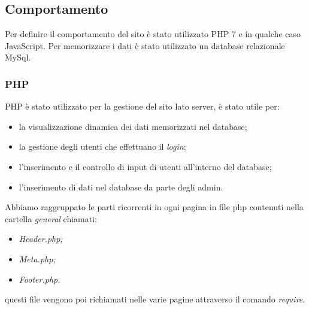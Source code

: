\subsection{Comportamento}
Per definire il comportamento del sito è stato utilizzato PHP 7 e in qualche caso JavaScript. \newline
Per memorizzare i dati è stato utilizzato un database relazionale MySql.
\subsubsection{PHP}
PHP è stato utilizzato per la gestione del sito lato server, è stato utile per: 
\begin{itemize}
    \item la visualizzazione dinamica dei dati memorizzati nel database;
    \item la gestione degli utenti che effettuano il \emph{login};
    \item l'inserimento e il controllo di input di utenti all'interno del database;
    \item l'inserimento di dati nel database da parte degli admin.
\end{itemize}
Abbiamo raggruppato le parti ricorrenti in ogni pagina in file php contenuti nella cartella \emph{general} chiamati:
\begin{itemize}
	\item \textit{Header.php;}
	\item \textit{Meta.php;}
	\item \textit{Footer.php.}
\end{itemize}
questi file vengono poi richiamati nelle varie pagine attraverso il comando \emph{require}.\newline

